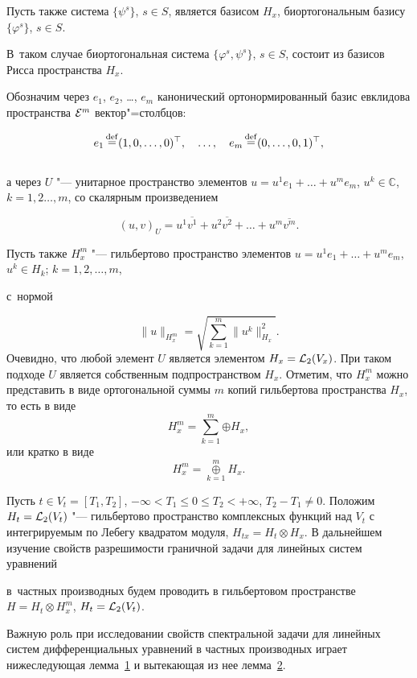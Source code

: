 Пусть также система $\{\psi^s\}$, $s\in S$, является базисом $H_x$, биортогональным базису $\{\varphi^s\}$, $s\in S$. 

В~таком случае биортогональная система $\{\varphi^s, \psi^s\}$, $s\in S$, состоит из базисов Рисса пространства $H_x$. 



Обозначим через $e_1$, $e_2$, \dots, $e_m$ канонический ортонормированный базис евклидова пространства ${\cal E}^m$ вектор"=столбцов: 

$$

e_1\mathop=\limits^{\rm def}(1,0,\dots,0)^\top, \quad  \dots,  \quad 

e_m\mathop=\limits^{\rm def}(0,\dots,0,1)^\top,$$  \\

а через $U$ "--- унитарное пространство элементов $u=u^1e_1+\ldots+u^me_m$, ${u^k\in\mathbb{C}}$, $k=1, 2\ldots,m$, со скалярным произведением 

$$(u,v)_U=u^1\overline{v^1}+ u^2\overline{v^2} +\ldots+u^m\overline{v^m}.$$ 

Пусть также $H_x^m$ "--- гильбертово пространство элементов $u=u^1e_1+\ldots+u^me_m$, $u^k\in H_k$; $k=1, 2,\dots,m$, 

с~нормой 

$$\|u\|_{H_x^m}=\sqrt{\sum\limits_{k=1}^m{\|u^k\|_{H_x}^2}}.$$ Очевидно, что любой элемент $U$ является элементом $H_x={\cal L}_2(V_x)$. При таком подходе $U$ является собственным подпространством $H_x$. Отметим, что $H_x^m$ можно представить в виде ортогональной суммы $m$ копий гильбертова пространства $H_x$, то есть в виде $$H_x^m=\sum\limits_{k=1}^m{\oplus H_x},$$ или кратко в виде $$H_x^m=\mathop\oplus\limits_{k=1}^m H_x.$$



Пусть $t\in V_t=[T_1,T_2]$, $-\infty<T_1\le0\le T_2<+\infty$, $T_2-T_1\ne0$. Положим $H_t={\cal L}_2(V_t)$ "--- гильбертово пространство комплексных функций над $V_t$ с интегрируемым по Лебегу квадратом модуля, $H_{tx}=H_t\otimes H_x$. В дальнейшем изучение свойств разрешимости граничной задачи для линейных систем уравнений 

в~частных производных будем проводить в гильбертовом пространстве $H=H_t\otimes H_x^m$, $H_t={\cal L}_2(V_t)$. 

Важную роль при исследовании свойств спектральной задачи для линейных систем дифференциальных уравнений в частных производных играет нижеследующая лемма~\hyperlink{korn:lemma:1}{1} и вытекающая из нее лемма~\hyperlink{korn:lemma:2}{2}.



